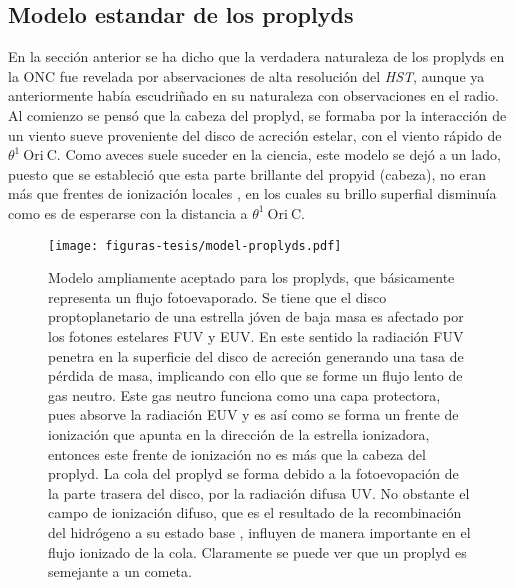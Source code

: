 \subsection{Modelo estandar de los proplyds}
\label{sec:modelo}

En la sección anterior se ha dicho que la verdadera naturaleza de los proplyds en la ONC fue revelada por abservaciones de alta resolución del \textit{HST}, aunque ya anteriormente \citet{Churchwell:1987} había escudriñado en su naturaleza  con observaciones en el radio. Al comienzo se pensó que la cabeza del proplyd, se formaba por la interacción de un viento sueve proveniente del disco de acreción estelar, con el viento rápido de \(\theta^1\ \text{Ori}\ \text{C}\). Como aveces suele suceder en la ciencia, este modelo se dejó a un lado, puesto que se estableció que esta parte brillante del propyid (cabeza), no eran más que frentes de ionización locales \citep{Odell:1994}, en los cuales su brillo superfial disminuía como es de esperarse con la distancia a  \(\theta^1\ \text{Ori}\ \text{C}\).\\

\begin{figure}
  \centering
  \texttt{[image: figuras-tesis/model-proplyds.pdf]}
  \caption{Modelo ampliamente aceptado para los proplyds, que básicamente representa un flujo fotoevaporado. Se tiene que el disco proptoplanetario de una estrella jóven de baja masa es afectado por los fotones estelares FUV y EUV. En este sentido la radiación FUV penetra en la superficie del disco de acreción generando una tasa de pérdida de masa, implicando con ello que se forme un flujo lento de gas neutro. Este gas neutro funciona como una capa protectora, pues absorve la radiación EUV y es así como se forma un frente de ionización que apunta en la dirección de la estrella ionizadora, entonces este frente de ionización no es más que la cabeza del proplyd. La cola del proplyd se forma debido a la fotoevopación de la parte trasera  del disco, por la radiación difusa UV. No obstante el campo de ionización difuso, que es el resultado de la recombinación del hidrógeno a su estado base \citep{Henney:1999a}, influyen de manera importante en el flujo ionizado de la cola. Claramente se puede ver que un proplyd es semejante a un cometa.  }
  \label{fig:modelo-proplyd}
\end{figure}

